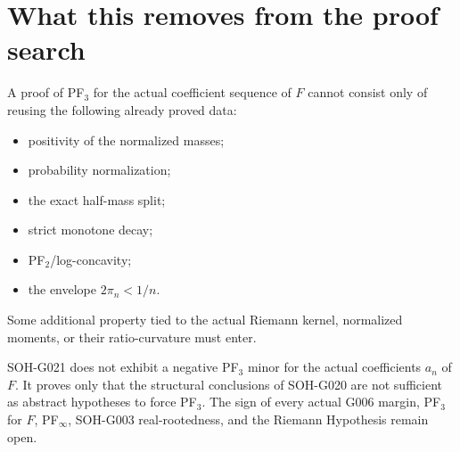 \section{What this removes from the proof search}

A proof of PF$_3$ for the actual coefficient sequence of $F$ cannot consist only of reusing the following already proved data:
\begin{itemize}
 \item positivity of the normalized masses;
 \item probability normalization;
 \item the exact half-mass split;
 \item strict monotone decay;
 \item PF$_2$/log-concavity;
 \item the envelope $2\pi_n<1/n$.
\end{itemize}
Some additional property tied to the actual Riemann kernel, normalized moments, or their ratio-curvature must enter.

\begin{warning}
SOH-G021 does not exhibit a negative PF$_3$ minor for the actual coefficients $a_n$ of $F$. It proves only that the structural conclusions of SOH-G020 are not sufficient as abstract hypotheses to force PF$_3$. The sign of every actual G006 margin, PF$_3$ for $F$, PF$_\infty$, SOH-G003 real-rootedness, and the Riemann Hypothesis remain open.
\end{warning}
